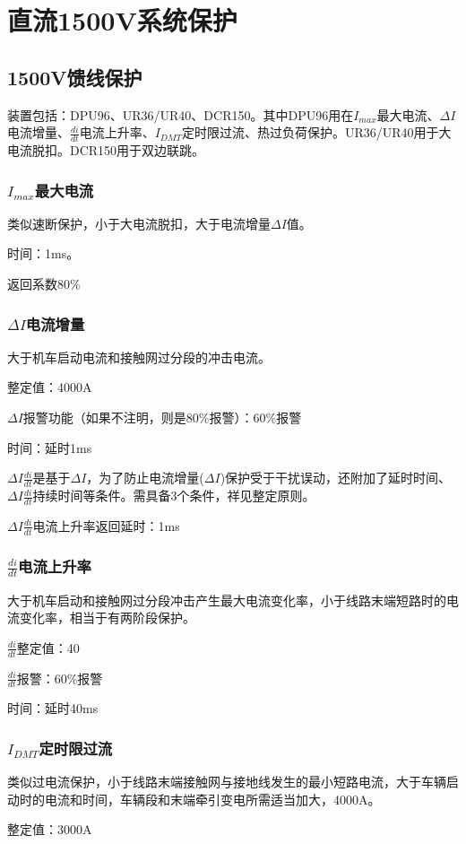 \section{直流1500V系统保护}
\subsection{1500V馈线保护}
装置包括：DPU96、UR36/UR40、DCR150。其中DPU96用在$I_{max}$最大电流、$\Delta I$电流增量、$\frac{di}{dt}$电流上升率、$I_{DMT}$定时限过流、热过负荷保护。UR36/UR40用于大电流脱扣。DCR150用于双边联跳。
\subsubsection{$I_{max}$最大电流}
类似速断保护，小于大电流脱扣，大于电流增量$\Delta I$值。\par 
时间：1ms。\par 
返回系数80\%
\subsubsection{$\Delta I$电流增量}
大于机车启动电流和接触网过分段的冲击电流。\par 
整定值：4000A\par 
$\Delta I$报警功能（如果不注明，则是80\%报警）：60\%报警\par 
时间：延时1ms\par 
$\Delta I\frac{di}{dt}$是基于$\Delta I$，为了防止电流增量($\Delta I$)保护受于干扰误动，还附加了延时时间、$\Delta I\frac{di}{dt}$持续时间等条件。需具备3个条件，祥见整定原则。\par 
$\Delta I\frac{di}{dt}$电流上升率返回延时：1ms
\subsubsection{$\frac{di}{dt}$电流上升率}
大于机车启动和接触网过分段冲击产生最大电流变化率，小于线路末端短路时的电流变化率，相当于有两阶段保护。 \par
$\frac{di}{dt}$整定值：40\par 
$\frac{di}{dt}$报警：60\%报警\par 
时间：延时40ms
\subsubsection{$I_{DMT}$定时限过流}类似过电流保护，小于线路末端接触网与接地线发生的最小短路电流，大于车辆启动时的电流和时间，车辆段和末端牵引变电所需适当加大，4000A。\par  
整定值：3000A

